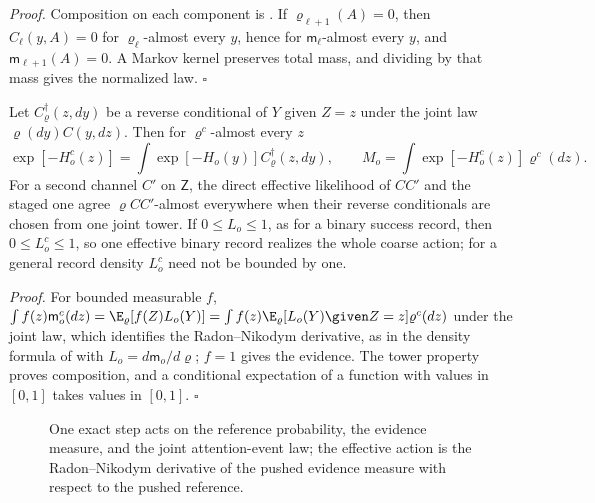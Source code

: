 \noindent\emph{Proof.}
Composition on each component is . If
$\varrho_{\ell+1}(A)=0$, then $C_\ell(y,A)=0$ for $\varrho_\ell$-almost every $y$,
hence for $\mathsf m_\ell$-almost every $y$, and $\mathsf m_{\ell+1}(A)=0$. A
Markov kernel preserves total mass, and dividing by that mass gives the normalized
law. $\square$

Let $C^\dagger_\varrho(z,dy)$ be a reverse conditional of $Y$ given $Z=z$ under
the joint law $\varrho(dy)C(y,dz)$. Then for $\varrho^c$-almost every $z$
\begin{equation}
\exp[-H_o^c(z)]
=\int\exp[-H_o(y)]C^\dagger_\varrho(z,dy),
\qquad
M_o=\int\exp[-H_o^c(z)]\varrho^c(dz).
\label{eq:rg-conditional-partition}
\end{equation}
For a second channel $C'$ on $\mathsf Z$, the direct effective likelihood of $CC'$
and the staged one agree $\varrho CC'$-almost everywhere when their reverse
conditionals are chosen from one joint tower. If $0\le L_o\le1$, as for a binary
success record, then $0\le L_o^c\le1$, so one effective binary record realizes the
whole coarse action; for a general record density $L_o^c$ need not be bounded by
one. 

\noindent\emph{Proof.}
For bounded measurable $f$, $\int f(z)\mathsf m_o^c(dz)=\E_\varrho[f(Z)L_o(Y)]
=\int f(z)\E_\varrho[L_o(Y)\given Z=z]\varrho^c(dz)$ under the joint law, which
identifies the Radon--Nikodym derivative, as in the density formula of
 with $L_o=d\mathsf m_o/d\varrho$; $f=1$ gives the
evidence. The tower property proves composition, and a conditional expectation of
a function with values in $[0,1]$ takes values in $[0,1]$. $\square$

\begin{figure}[htbp]
\centering
{}
\caption{One exact step acts on the reference probability, the evidence measure,
and the joint attention-event law; the effective action is the Radon--Nikodym
derivative of the pushed evidence measure with respect to the pushed reference.}
\label{fig:rg-exact-measure-flow}
\end{figure}

